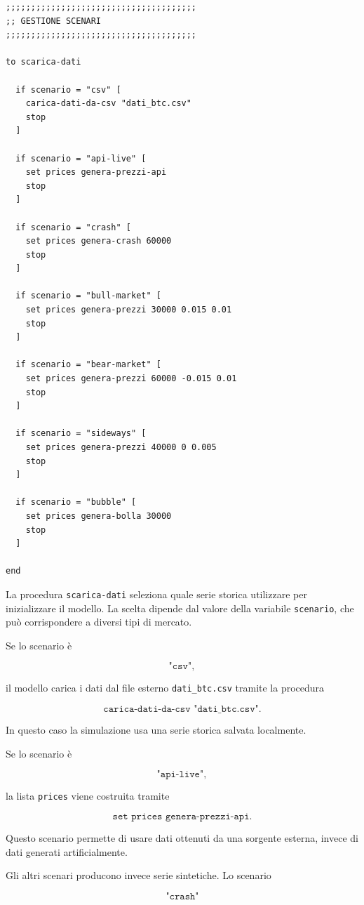 \begin{lstlisting}[caption={Procedura per la selezione dello scenario di mercato}]
;;;;;;;;;;;;;;;;;;;;;;;;;;;;;;;;;;;;;;
;; GESTIONE SCENARI
;;;;;;;;;;;;;;;;;;;;;;;;;;;;;;;;;;;;;;

to scarica-dati

  if scenario = "csv" [
    carica-dati-da-csv "dati_btc.csv"
    stop
  ]

  if scenario = "api-live" [
    set prices genera-prezzi-api
    stop
  ]

  if scenario = "crash" [
    set prices genera-crash 60000
    stop
  ]

  if scenario = "bull-market" [
    set prices genera-prezzi 30000 0.015 0.01
    stop
  ]

  if scenario = "bear-market" [
    set prices genera-prezzi 60000 -0.015 0.01
    stop
  ]

  if scenario = "sideways" [
    set prices genera-prezzi 40000 0 0.005
    stop
  ]

  if scenario = "bubble" [
    set prices genera-bolla 30000
    stop
  ]

end
\end{lstlisting}

La procedura \texttt{scarica-dati} seleziona quale serie storica utilizzare per
inizializzare il modello. La scelta dipende dal valore della variabile
\texttt{scenario}, che può corrispondere a diversi tipi di mercato.

Se lo scenario è

\[
\texttt{"csv"},
\]

il modello carica i dati dal file esterno \texttt{dati\_btc.csv} tramite la
procedura

\[
\texttt{carica-dati-da-csv "dati\_btc.csv"}.
\]

In questo caso la simulazione usa una serie storica salvata localmente.

Se lo scenario è

\[
\texttt{"api-live"},
\]

la lista \texttt{prices} viene costruita tramite

\[
\texttt{set prices genera-prezzi-api}.
\]

Questo scenario permette di usare dati ottenuti da una sorgente esterna, invece
di dati generati artificialmente.

Gli altri scenari producono invece serie sintetiche. Lo scenario

\[
\texttt{"crash"}
\]

